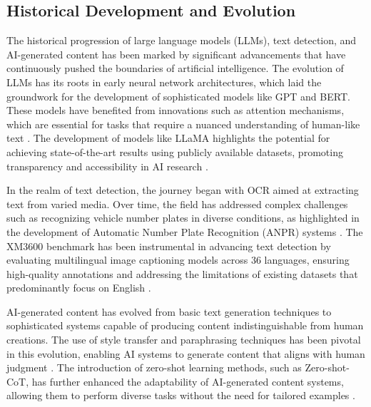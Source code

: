 \subsection{Historical Development and Evolution} \label{subsec:Historical Development and Evolution}



The historical progression of large language models (LLMs), text detection, and AI-generated content has been marked by significant advancements that have continuously pushed the boundaries of artificial intelligence. The evolution of LLMs has its roots in early neural network architectures, which laid the groundwork for the development of sophisticated models like GPT and BERT. These models have benefited from innovations such as attention mechanisms, which are essential for tasks that require a nuanced understanding of human-like text \cite{park2022attentionmechanismsphysiologicalsignal}. The development of models like LLaMA highlights the potential for achieving state-of-the-art results using publicly available datasets, promoting transparency and accessibility in AI research \cite{touvron2023llama}.



In the realm of text detection, the journey began with OCR aimed at extracting text from varied media. Over time, the field has addressed complex challenges such as recognizing vehicle number plates in diverse conditions, as highlighted in the development of Automatic Number Plate Recognition (ANPR) systems \cite{adak2022automaticnumberplaterecognition}. The XM3600 benchmark has been instrumental in advancing text detection by evaluating multilingual image captioning models across 36 languages, ensuring high-quality annotations and addressing the limitations of existing datasets that predominantly focus on English \cite{thapliyal2022crossmodal3600massivelymultilingualmultimodal}.



AI-generated content has evolved from basic text generation techniques to sophisticated systems capable of producing content indistinguishable from human creations. The use of style transfer and paraphrasing techniques has been pivotal in this evolution, enabling AI systems to generate content that aligns with human judgment \cite{yamshchikov2020styletransferparaphraselookingsensible}. The introduction of zero-shot learning methods, such as Zero-shot-CoT, has further enhanced the adaptability of AI-generated content systems, allowing them to perform diverse tasks without the need for tailored examples \cite{kojima2022large}.



